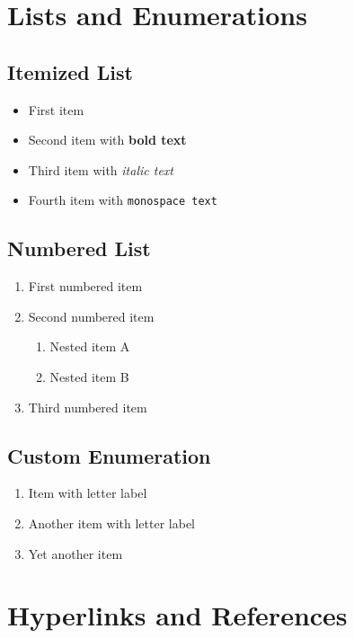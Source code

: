 \documentclass[12pt,a4paper]{article}
\begin{document}
\section{Lists and Enumerations}

\subsection{Itemized List}

\begin{itemize}
    \item First item
    \item Second item with \textbf{bold text}
    \item Third item with \textit{italic text}
    \item Fourth item with \texttt{monospace text}
\end{itemize}

\subsection{Numbered List}

\begin{enumerate}
    \item First numbered item
    \item Second numbered item
        \begin{enumerate}
            \item Nested item A
            \item Nested item B
        \end{enumerate}
    \item Third numbered item
\end{enumerate}

\subsection{Custom Enumeration}

\begin{enumerate}[label=(\alph*)]
    \item Item with letter label
    \item Another item with letter label
    \item Yet another item
\end{enumerate}

\section{Hyperlinks and References}
\end{document}
